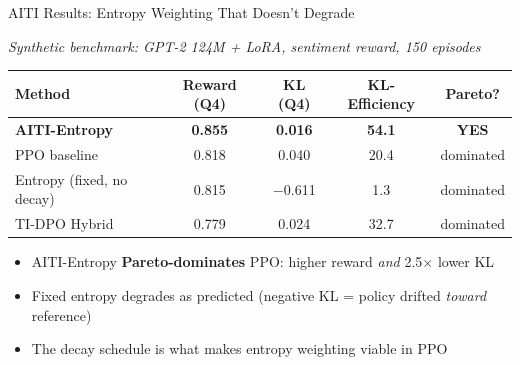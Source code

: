 \documentclass[aspectratio=169,10pt]{beamer}
\begin{document}
\begin{frame}{AITI Results: Entropy Weighting That Doesn't Degrade}

\textit{\scriptsize Synthetic benchmark: GPT-2 124M + LoRA, sentiment reward, 150 episodes}
\begin{table}
\begin{tabular}{lcccc}
\toprule
Method & Reward (Q4) & KL (Q4) & KL-Efficiency & Pareto? \\
\midrule
\textbf{AITI-Entropy} & \textbf{0.855} & \textbf{0.016} & \textbf{54.1} & \textcolor{good}{\textbf{YES}} \\
PPO baseline & 0.818 & 0.040 & 20.4 & dominated \\
Entropy (fixed, no decay) & 0.815 & $-$0.611 & 1.3 & dominated \\
TI-DPO Hybrid & 0.779 & 0.024 & 32.7 & dominated \\
\bottomrule
\end{tabular}
\end{table}

\vspace{0.3cm}
\begin{itemize}
    \item AITI-Entropy \textbf{Pareto-dominates} PPO: higher reward \textit{and} 2.5$\times$ lower KL
    \item Fixed entropy degrades as predicted (negative KL = policy drifted \textit{toward} reference)
    \item The decay schedule is what makes entropy weighting viable in PPO
\end{itemize}

\end{frame}
\end{document}
